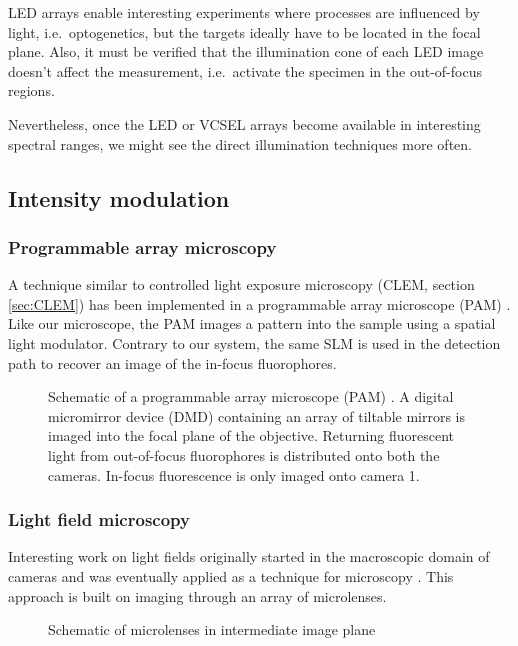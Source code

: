 LED arrays enable interesting experiments where processes are
influenced by light, i.e.\ optogenetics, but the targets ideally have
to be located in the focal plane. Also, it must be verified that the
illumination cone of each LED image doesn't affect the measurement,
i.e.\ activate the specimen in the out-of-focus regions.

Nevertheless, once the LED or VCSEL arrays become available in
interesting spectral ranges, we might see the direct illumination
techniques more often.

\subsection{Intensity modulation}
\subsubsection{Programmable array microscopy}
A technique similar to controlled light exposure microscopy (CLEM,
section \ref{sec:CLEM}) has been implemented in a programmable array
microscope (PAM) \citep{Caarls2011}. Like our microscope, the PAM
images a pattern into the sample using a spatial light
modulator. Contrary to our system, the same SLM is used in the
detection path to recover an image of the in-focus fluorophores.

\begin{figure}[!hbt]
  \centering
  \caption{Schematic of a programmable array microscope (PAM)
    \citep[inspired from][]{Verveer1998}. A digital micromirror
    device (DMD) containing an array of tiltable mirrors is imaged
    into the focal plane of the objective. Returning fluorescent light
    from out-of-focus fluorophores is distributed onto both the
    cameras. In-focus fluorescence is only imaged onto camera 1.}
  \label{fig:pam-sketch}
\end{figure}


%
%
%

\subsubsection{Light field microscopy}
\label{sec:light-field-microscopy}
Interesting work on light fields originally started in the macroscopic
domain of cameras \citep{Lippmann1908%
} and was eventually applied as a technique for microscopy
\citep{Levoy2006,Levoy2009,Zhang2009}. This approach is built on
imaging through an array of microlenses.
\begin{figure}[!hbt]
  \centering
  \caption{Schematic of microlenses in intermediate image plane
    \citep[inspired from][]{Levoy2006}}
  \label{fig:microlens-levoy-sketch}
\end{figure}

